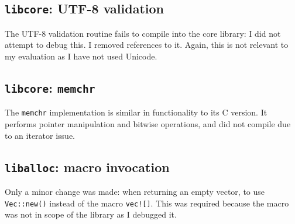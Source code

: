 \documentclass[dissertation.tex]{subfiles}
\begin{document}
\subsection{\texttt{libcore}: UTF-8 validation}
The UTF-8 validation routine fails to compile into the core library: I
did not attempt to debug this.
I removed references to it.
Again, this is not relevant to my evaluation as I have not used Unicode.


\subsection{\texttt{libcore}: \texttt{memchr}}
The \texttt{memchr} implementation is similar in functionality to its C
version.
It performs pointer manipulation and bitwise operations, and did not
compile due to an iterator issue.


\subsection{\texttt{liballoc}: macro invocation}
Only a minor change was made: when returning an empty vector, to use
\texttt{Vec::new()} instead of the macro \texttt{vec![]}.
This was required because the macro was not in scope of the library as I
debugged it.
\end{document}
